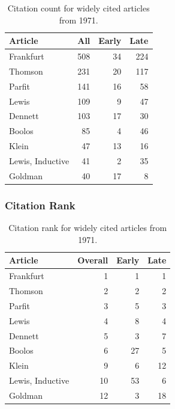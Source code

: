 \documentclass[
  10pt,
  letterpaper,
  DIV=11,
  numbers=noendperiod,
  twoside]{scrartcl}
\begin{document}
\begin{longtable}[]{@{}lrrr@{}}

\caption{\label{tbl-citation-count-1971}Citation count for widely cited
articles from 1971.}

\tabularnewline

\toprule\noalign{}
Article & All & Early & Late \\
\midrule\noalign{}
\endhead
\bottomrule\noalign{}
\endlastfoot
Frankfurt & 508 & 34 & 224 \\
Thomson & 231 & 20 & 117 \\
Parfit & 141 & 16 & 58 \\
Lewis & 109 & 9 & 47 \\
Dennett & 103 & 17 & 30 \\
Boolos & 85 & 4 & 46 \\
Klein & 47 & 13 & 16 \\
Lewis, Inductive & 41 & 2 & 35 \\
Goldman & 40 & 17 & 8 \\

\end{longtable}

\subsubsection*{Citation Rank}\label{sec-rank-1971}

\begin{longtable}[]{@{}lrrr@{}}

\caption{\label{tbl-citation-rank-1971}Citation rank for widely cited
articles from 1971.}

\tabularnewline

\toprule\noalign{}
Article & Overall & Early & Late \\
\midrule\noalign{}
\endhead
\bottomrule\noalign{}
\endlastfoot
Frankfurt & 1 & 1 & 1 \\
Thomson & 2 & 2 & 2 \\
Parfit & 3 & 5 & 3 \\
Lewis & 4 & 8 & 4 \\
Dennett & 5 & 3 & 7 \\
Boolos & 6 & 27 & 5 \\
Klein & 9 & 6 & 12 \\
Lewis, Inductive & 10 & 53 & 6 \\
Goldman & 12 & 3 & 18 \\

\end{longtable}
\end{document}
